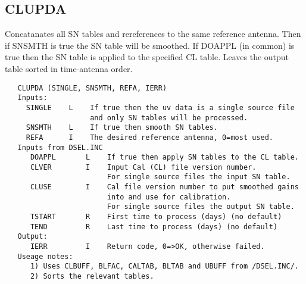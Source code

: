 \subsection{CLUPDA}
Concatanates all SN tables and rereferences to the same reference
antenna.  Then if SNSMTH is true the SN table will be smoothed.
If DOAPPL (in common) is true then the SN table is applied to the
specified CL table.
Leaves the output table sorted in time-antenna order.
\begin{verbatim}
   CLUPDA (SINGLE, SNSMTH, REFA, IERR)
   Inputs:
     SINGLE    L    If true then the uv data is a single source file
                    and only SN tables will be processed.
     SNSMTH    L    If true then smooth SN tables.
     REFA      I    The desired reference antenna, 0=most used.
   Inputs from DSEL.INC
      DOAPPL       L    If true then apply SN tables to the CL table.
      CLVER        I    Input Cal (CL) file version number.
                        For single source files the input SN table.
      CLUSE        I    Cal file version number to put smoothed gains
                        into and use for calibration.
                        For single source files the output SN table.
      TSTART       R    First time to process (days) (no default)
      TEND         R    Last time to process (days) (no default)
   Output:
      IERR         I    Return code, 0=>OK, otherwise failed.
   Useage notes:
      1) Uses CLBUFF, BLFAC, CALTAB, BLTAB and UBUFF from /DSEL.INC/.
      2) Sorts the relevant tables.
\end{verbatim}

